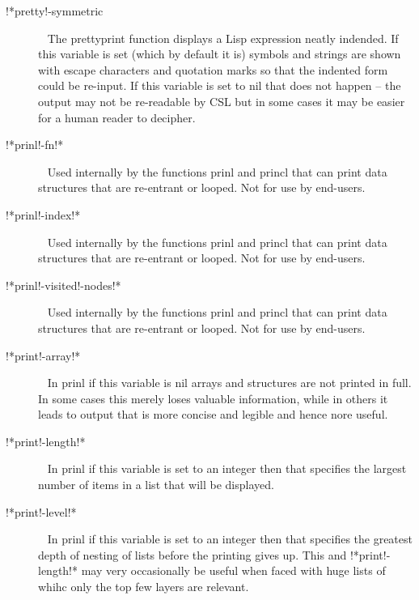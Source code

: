 \documentclass[a4paper,11pt]{article}
\begin{document}
\begin{description}
\item [{\ttfamily !*pretty!-symmetric}]  ~\newline
The {\ttfamily prettyprint} function displays a Lisp expression neatly
indended. If this variable is set (which by default it is) symbols and
strings are shown with escape characters and quotation marks so that the
indented form could be re-input. If this variable is set to {\ttfamily nil}
that does not happen -- the output may not be re-readable by CSL but in
some cases it may be easier for a human reader to decipher.

\item [{\ttfamily !*prinl!-fn!*}]  ~\newline
Used internally by the functions {\ttfamily prinl} and {\ttfamily princl}
that can print data structures that are re-entrant or looped. Not for use
by end-users.

\item [{\ttfamily !*prinl!-index!*}]  ~\newline
Used internally by the functions {\ttfamily prinl} and {\ttfamily princl}
that can print data structures that are re-entrant or looped. Not for use
by end-users.

\item [{\ttfamily !*prinl!-visited!-nodes!*}]  ~\newline
Used internally by the functions {\ttfamily prinl} and {\ttfamily princl}
that can print data structures that are re-entrant or looped. Not for use
by end-users.

\item [{\ttfamily !*print!-array!*}]  ~\newline
In {\ttfamily prinl} if this variable is {\ttfamily nil} arrays and
structures are not printed in full. In some cases this merely loses valuable
information, while in others it leads to output that is more concise and
legible and hence nore useful.

\item [{\ttfamily !*print!-length!*}]  ~\newline
In {\ttfamily prinl} if this variable is set to an integer then that specifies
the largest number of items in a list that will be displayed.

\item [{\ttfamily !*print!-level!*}]  ~\newline
In {\ttfamily prinl} if this variable is set to an integer then that specifies
the greatest depth of nesting of lists before the printing gives up. This
and {\ttfamily !*print!-length!*} may very occasionally be useful when
faced with huge lists of whihc only the top few layers are relevant.


\end{description}
\end{document}
